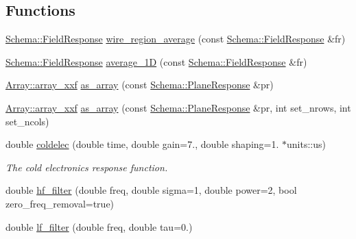 \subsection*{Functions}
\begin{DoxyCompactItemize}
\item 
\hyperlink{struct_wire_cell_1_1_response_1_1_schema_1_1_field_response}{Schema\+::\+Field\+Response} \hyperlink{namespace_wire_cell_1_1_response_a11620870420942188de46612d3e2022f}{wire\+\_\+region\+\_\+average} (const \hyperlink{struct_wire_cell_1_1_response_1_1_schema_1_1_field_response}{Schema\+::\+Field\+Response} \&fr)
\item 
\hyperlink{struct_wire_cell_1_1_response_1_1_schema_1_1_field_response}{Schema\+::\+Field\+Response} \hyperlink{namespace_wire_cell_1_1_response_a465144cc99feb1c0e2e85c6928ae2506}{average\+\_\+1D} (const \hyperlink{struct_wire_cell_1_1_response_1_1_schema_1_1_field_response}{Schema\+::\+Field\+Response} \&fr)
\item 
\hyperlink{namespace_wire_cell_1_1_array_ab565fef5e33632bb02f0ed4be803020c}{Array\+::array\+\_\+xxf} \hyperlink{namespace_wire_cell_1_1_response_a8f1890f06132c13edca92ab1d9ea9263}{as\+\_\+array} (const \hyperlink{struct_wire_cell_1_1_response_1_1_schema_1_1_plane_response}{Schema\+::\+Plane\+Response} \&pr)
\item 
\hyperlink{namespace_wire_cell_1_1_array_ab565fef5e33632bb02f0ed4be803020c}{Array\+::array\+\_\+xxf} \hyperlink{namespace_wire_cell_1_1_response_aeb8f98a26e027557baaaafe032d887e7}{as\+\_\+array} (const \hyperlink{struct_wire_cell_1_1_response_1_1_schema_1_1_plane_response}{Schema\+::\+Plane\+Response} \&pr, int set\+\_\+nrows, int set\+\_\+ncols)
\item 
double \hyperlink{namespace_wire_cell_1_1_response_a4fc0f118f72199a91582863c978b803c}{coldelec} (double time, double gain=7., double shaping=1. $\ast$units\+::us)
\begin{DoxyCompactList}\small\item\em The cold electronics response function. \end{DoxyCompactList}\item 
double \hyperlink{namespace_wire_cell_1_1_response_a1a0252a5992f6d7cf76f5b1b0adcf544}{hf\+\_\+filter} (double freq, double sigma=1, double power=2, bool zero\+\_\+freq\+\_\+removal=true)
\item 
double \hyperlink{namespace_wire_cell_1_1_response_af61a79565c364b71935a42d74ddd3831}{lf\+\_\+filter} (double freq, double tau=0.)
\end{DoxyCompactItemize}


